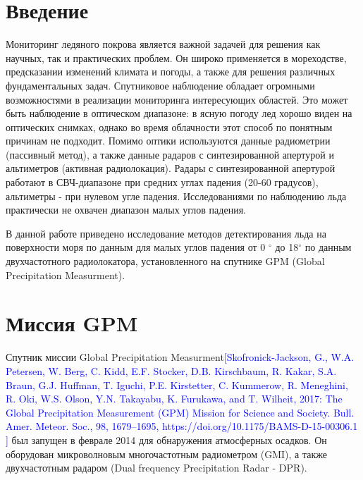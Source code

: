 





\tableofcontents
\newpage
\section{Введение}

Мониторинг ледяного покрова является важной задачей для решения как научных, так и практических проблем. Он широко
применяется в мореходстве, предсказании изменений климата и погоды, а также для решения различных фундаментальных задач.
Спутниковое наблюдение обладает огромными возможностями в реализации мониторинга интересующих областей.
Это может быть наблюдение в оптическом диапазоне: в ясную погоду лед хорошо виден на оптических снимках, однако во время
облачности этот способ по понятным причинам не подходит. Помимо оптики используются данные радиометрии (пассивный
метод), а также данные радаров с синтезированной апертурой и альтиметров (активная радиолокация). Радары с
синтезированной апертурой работают в СВЧ-диапазоне при средних углах падения (20-60 градусов), альтиметры - при нулевом
угле падения. Исследованиями по наблюдению льда практически не охвачен диапазон малых углов падения.

В данной работе приведено исследование методов детектирования льда на поверхности моря по данным для малых углов падения
от 0 $^{\circ}$ до 18$^{\circ}$ по данным двухчастотного радиолокатора, установленного на спутнике GPM (Global
Precipitation Measurment).


\section{Миссия GPM}
Спутник миссии Global Precipitation Measurment\textcolor{blue}{[Skofronick-Jackson, G., W.A. Petersen, W. Berg, C. Kidd,
E.F. Stocker, D.B. Kirschbaum, R. Kakar, S.A. Braun, G.J. Huffman, T. Iguchi, P.E. Kirstetter, C. Kummerow, R.
Meneghini, R. Oki, W.S. Olson, Y.N. Takayabu, K. Furukawa, and T. Wilheit, 2017: The Global Precipitation Measurement
(GPM) Mission for Science and Society. Bull. Amer. Meteor. Soc., 98, 1679–1695,
https://doi.org/10.1175/BAMS-D-15-00306.1 ]} был запущен в феврале 2014 для обнаружения атмосферных осадков.
Он оборудован микроволновым многочастотным радиометром (GMI), а также двухчастотным радаром (Dual frequency
Precipitation Radar - DPR). 

